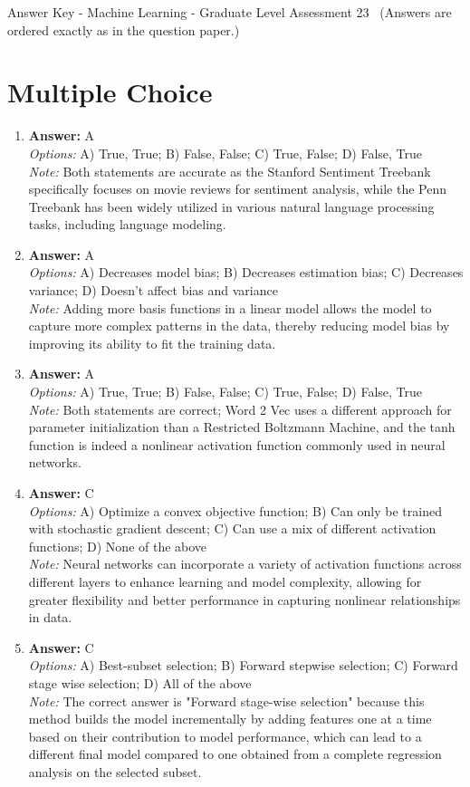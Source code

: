 \documentclass[12pt]{article}
\begin{document}
\begin{center}
Answer Key - Machine Learning - Graduate Level Assessment 23 \
\small (Answers are ordered exactly as in the question paper.)
\end{center}

\section*{Multiple Choice}
\begin{enumerate}[label=\arabic*.]
\item \textbf{Answer:} A
\\ \textit{Options:} A) True, True; B) False, False; C) True, False; D) False, True
\\ \textit{Note:} Both statements are accurate as the Stanford Sentiment Treebank specifically focuses on movie reviews for sentiment analysis, while the Penn Treebank has been widely utilized in various natural language processing tasks, including language modeling.
\item \textbf{Answer:} A
\\ \textit{Options:} A) Decreases model bias; B) Decreases estimation bias; C) Decreases variance; D) Doesn't affect bias and variance
\\ \textit{Note:} Adding more basis functions in a linear model allows the model to capture more complex patterns in the data, thereby reducing model bias by improving its ability to fit the training data.
\item \textbf{Answer:} A
\\ \textit{Options:} A) True, True; B) False, False; C) True, False; D) False, True
\\ \textit{Note:} Both statements are correct; Word 2 Vec uses a different approach for parameter initialization than a Restricted Boltzmann Machine, and the tanh function is indeed a nonlinear activation function commonly used in neural networks.
\item \textbf{Answer:} C
\\ \textit{Options:} A) Optimize a convex objective function; B) Can only be trained with stochastic gradient descent; C) Can use a mix of different activation functions; D) None of the above
\\ \textit{Note:} Neural networks can incorporate a variety of activation functions across different layers to enhance learning and model complexity, allowing for greater flexibility and better performance in capturing nonlinear relationships in data.
\item \textbf{Answer:} C
\\ \textit{Options:} A) Best-subset selection; B) Forward stepwise selection; C) Forward stage wise selection; D) All of the above
\\ \textit{Note:} The correct answer is "Forward stage-wise selection" because this method builds the model incrementally by adding features one at a time based on their contribution to model performance, which can lead to a different final model compared to one obtained from a complete regression analysis on the selected subset.
\end{enumerate}
\end{document}
